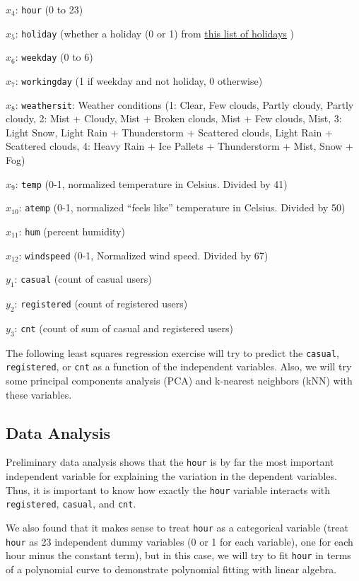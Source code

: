 \documentclass[
]{article}
\begin{document}
\(x_{4}\): \texttt{hour} (0 to 23)

\(x_{5}\): \texttt{holiday} (whether a holiday (0 or 1) from
\color{blue}
\href{https://dchrc.dc.gov/page/holiday-schedule}{this list of holidays}
\color{black} )

\(x_{6}\): \texttt{weekday} (0 to 6)

\(x_{7}\): \texttt{workingday} (1 if weekday and not holiday, 0
otherwise)

\(x_{8}\): \texttt{weathersit}: Weather conditions (1: Clear, Few
clouds, Partly cloudy, Partly cloudy, 2: Mist + Cloudy, Mist + Broken
clouds, Mist + Few clouds, Mist, 3: Light Snow, Light Rain +
Thunderstorm + Scattered clouds, Light Rain + Scattered clouds, 4: Heavy
Rain + Ice Pallets + Thunderstorm + Mist, Snow + Fog)

\(x_{9}\): \texttt{temp} (0-1, normalized temperature in Celsius.
Divided by 41)

\(x_{10}\): \texttt{atemp} (0-1, normalized ``feels like'' temperature
in Celsius. Divided by 50)

\(x_{11}\): \texttt{hum} (percent humidity)

\(x_{12}\): \texttt{windspeed} (0-1, Normalized wind speed. Divided by
67)

\(y_{1}\): \texttt{casual} (count of casual users)

\(y_{2}\): \texttt{registered} (count of registered users)

\(y_{3}\): \texttt{cnt} (count of sum of casual and registered users)

The following least squares regression exercise will try to predict the
\texttt{casual}, \texttt{registered}, or \texttt{cnt} as a function of
the independent variables. Also, we will try some principal components
analysis (PCA) and k-nearest neighbors (kNN) with these variables.

\hypertarget{data-analysis}{%
\subsection{Data Analysis}\label{data-analysis}}

Preliminary data analysis shows that the \texttt{hour} is by far the
most important independent variable for explaining the variation in the
dependent variables. Thus, it is important to know how exactly the
\texttt{hour} variable interacts with \texttt{registered},
\texttt{casual}, and \texttt{cnt}.

We also found that it makes sense to treat \texttt{hour} as a
categorical variable (treat \texttt{hour} as 23 independent dummy
variables (0 or 1 for each variable), one for each hour minus the
constant term), but in this case, we will try to fit \texttt{hour} in
terms of a polynomial curve to demonstrate polynomial fitting with
linear algebra.
\end{document}
